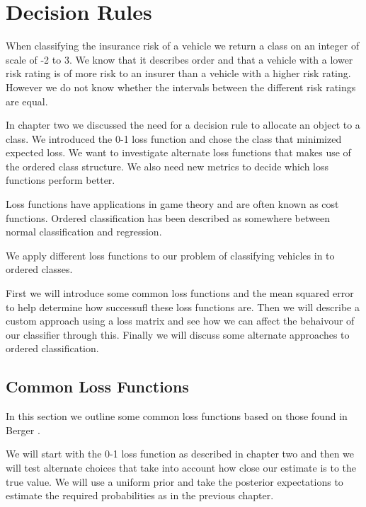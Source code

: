 \chapter{Decision Rules}

When classifying the insurance risk of a vehicle we return a class on an integer of scale of -2 to 3.
We know that it describes order and that a vehicle with a lower risk rating is of more risk to an insurer than a vehicle with a higher risk rating.
However we do not know whether the intervals between the different risk ratings are equal.

In chapter two we discussed the need for a decision rule to allocate an object to a class.
We introduced the 0-1 loss function and chose the class that minimized expected loss.
We want to investigate alternate loss functions that makes use of the ordered class structure.
We also need new metrics to decide which loss functions perform better.

Loss functions have applications in game theory and are often known as cost functions.
Ordered classification has been described as somewhere between normal classification and regression.

We apply different loss functions to our problem of classifying vehicles in to ordered classes.


First we will introduce some common loss functions and the mean squared error to help determine how successufl these loss functions are.
Then we will describe a custom approach using a loss matrix and see how we can affect the behaivour of our classifier through this.
Finally we will discuss some alternate approaches to ordered classification.


\section{Common Loss Functions}

In this section we outline some common loss functions based on those found in Berger \cite{Berger85}.

We will start with the 0-1 loss function as described in chapter two and then we will test alternate choices that take into account how close our estimate is to the true value.
We will use a uniform prior and take the posterior expectations to estimate the required probabilities as in the previous chapter.

